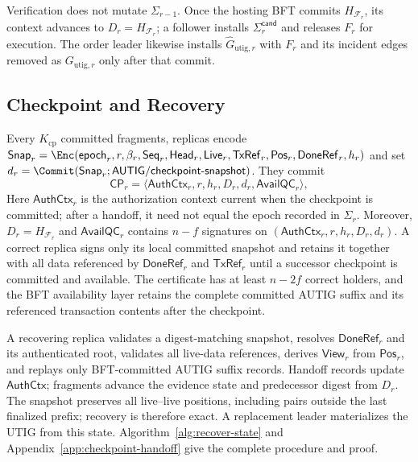Verification does not mutate $\Sigma_{r-1}$.  Once the hosting BFT commits
$H_{\mathcal F_r}$, its context advances to $D_r=H_{\mathcal F_r}$; a follower
installs $\Sigma_r^{\mathsf{cand}}$ and releases $F_r$ for execution.  The
order leader likewise installs $\widehat G_{\mathrm{utig},r}$ with $F_r$ and
its incident edges removed as $G_{\mathrm{utig},r}$ only after that commit.

\subsection{Checkpoint and Recovery}
\label{sec:checkpoint-recovery}

Every $K_{\mathrm{cp}}$ committed fragments, replicas encode
$\mathsf{Snap}_r=\Enc(\mathsf{epoch}_r,r,\beta_r,\mathsf{Seq}_r,
\mathsf{Head}_r,\mathsf{Live}_r,\mathsf{TxRef}_r,\mathsf{Pos}_r,
\mathsf{DoneRef}_r,h_r)$ and set
$d_r=\Commit(\mathsf{Snap}_r;\mathsf{AUTIG/checkpoint\mbox{-}snapshot})$.  They commit
\begin{equation}
 \mathsf{CP}_r=\langle\mathsf{AuthCtx}_r,r,h_r,D_r,d_r,
                       \mathsf{AvailQC}_r\rangle,
 \label{eq:checkpoint}
\end{equation}
Here $\mathsf{AuthCtx}_r$ is the authorization context current when the
checkpoint is committed; after a handoff, it need not equal the epoch recorded
in $\Sigma_r$.  Moreover, $D_r=H_{\mathcal F_r}$ and $\mathsf{AvailQC}_r$ contains $n-f$
signatures on $(\mathsf{AuthCtx}_r,r,h_r,D_r,d_r)$.  A correct replica signs only its local
committed snapshot and retains it together with all data referenced by
$\mathsf{DoneRef}_r$ and $\mathsf{TxRef}_r$ until a successor checkpoint is
committed and available.  The certificate has
at least $n-2f$ correct holders, and the BFT availability layer retains the
complete committed AUTIG suffix and its referenced transaction contents after
the checkpoint.

A recovering replica validates a digest-matching snapshot, resolves
$\mathsf{DoneRef}_r$ and its authenticated root, validates all live-data
references, derives $\mathsf{View}_r$ from $\mathsf{Pos}_r$, and replays only
BFT-committed AUTIG suffix records.  Handoff records update
$\mathsf{AuthCtx}$; fragments advance the evidence state and predecessor digest
from $D_r$.  The snapshot preserves all live--live
positions, including pairs outside the last finalized prefix; recovery is
therefore exact.  A replacement leader materializes the UTIG from this state.
Algorithm~\ref{alg:recover-state} and Appendix~\ref{app:checkpoint-handoff}
give the complete procedure and proof.


